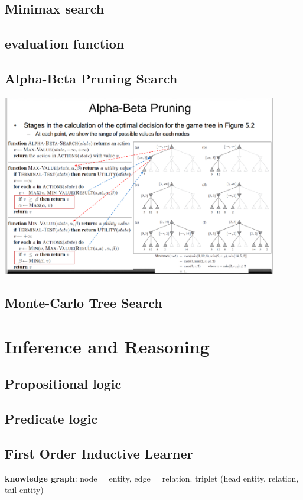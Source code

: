 \documentclass[11pt]{article}
\begin{document}
\subsection{Minimax search}
\label{sec:orgf348906}
\subsection{evaluation function}
\label{sec:orgf3f7b6f}
\subsection{Alpha-Beta Pruning Search}
\label{sec:org2f0d821}
\includegraphics[width=0.9\textwidth]{ABP}
\subsection{Monte-Carlo Tree Search}
\label{sec:org3789fc4}

\section{Inference and Reasoning}
\label{sec:orgc7aa1b4}
\subsection{Propositional logic}
\label{sec:orgf2b54aa}
\subsection{Predicate logic}
\label{sec:orgc0cfbb2}
\subsection{First Order Inductive Learner}
\label{sec:org2cfddee}
\textbf{knowledge graph}: node = entity, edge = relation.
triplet (head entity, relation, tail entity)
\end{document}
